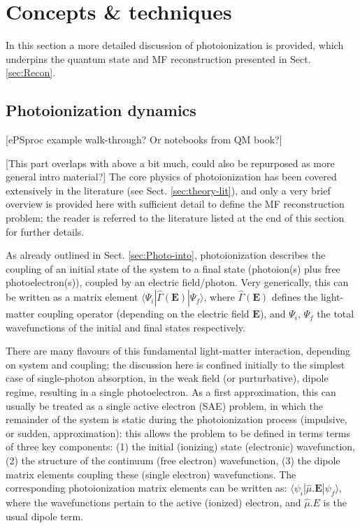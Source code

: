 \section{Concepts \& techniques\label{sec:Concepts}}

In this section a more detailed discussion of photoionization is provided, which underpins the quantum state and MF reconstruction presented in Sect. \ref{sec:Recon}.

\subsection{Photoionization dynamics} 
[ePSproc example walk-through? Or notebooks from QM book?]

[This part overlaps with above a bit much, could also be repurposed as more general intro material?]
The core physics of photoionization has been covered extensively in the literature (see Sect. \ref{sec:theory-lit}), and only a very brief overview is provided here with sufficient detail to define the MF reconstruction problem; the reader is referred to the literature listed at the end of this section for further details.

As already outlined in Sect. \ref{sec:Photo-into}, photoionization describes the coupling of an initial state of the system to a final state (photoion(s) plus free photoelectron(s)), coupled by an electric field/photon. Very generically, this can be written as a matrix element $\langle\Psi_i|\hat{\Gamma}(\boldsymbol{\mathbf{E}})|\Psi_f\rangle$, where $\hat{\Gamma}(\boldsymbol{\mathbf{E}})$ defines the light-matter coupling operator (depending on the electric field $\boldsymbol{\mathbf{E}}$), and $\Psi_i$, $\Psi_f$ the total wavefunctions of the initial and final states respectively. 

There are many flavours of this fundamental light-matter interaction, depending on system and coupling; the discussion here is confined initially to the simplest case of single-photon absorption, in the weak field (or purturbative), dipole regime, resulting in a single photoelectron.
As a first approximation, this can usually be treated as a single active electron (SAE) problem, in which the remainder of the system is static during the photoionization process (impulsive, or sudden, approximation): this allows the problem to be defined in terms terms of three key components: (1) the initial (ionizing) state (electronic) wavefunction, (2) the structure of the continuum (free electron) wavefunction, (3) the dipole matrix elements coupling these (single electron) wavefunctions. The corresponding photoionization matrix elements can be written as: $\langle\psi_i|\hat{\mu}.\boldsymbol{\mathbf{E}}|\psi_f\rangle$, where the wavefunctions pertain to the active (ionized) electron, and $\hat{\mu}.E$ is the usual dipole term.

